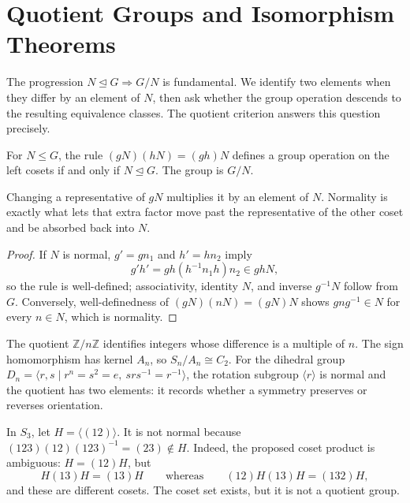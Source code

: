 \section{Quotient Groups and Isomorphism Theorems}

The progression \(N\trianglelefteq G\Rightarrow G/N\) is fundamental.  We
identify two elements when they differ by an element of \(N\), then ask whether
the group operation descends to the resulting equivalence classes.  The
quotient criterion answers this question precisely.

\begin{theorem}
For \(N\leq G\), the rule \((gN)(hN)=(gh)N\) defines a group operation on
the left cosets if and only if \(N\trianglelefteq G\).  The group is \(G/N\).
\end{theorem}
\begin{proofidea}
Changing a representative of \(gN\) multiplies it by an element of \(N\).
Normality is exactly what lets that extra factor move past the representative
of the other coset and be absorbed back into \(N\).
\end{proofidea}
\begin{proof}
If \(N\) is normal, \(g'=gn_1\) and \(h'=hn_2\) imply
\[
g'h'=gh(h^{-1}n_1h)n_2\in ghN,
\]
so the rule is well-defined; associativity, identity \(N\), and inverse
\(g^{-1}N\) follow from \(G\).  Conversely, well-definedness of
\((gN)(nN)=(gN)N\) shows \(gng^{-1}\in N\) for every \(n\in N\), which is
normality.
\end{proof}

\begin{example}
The quotient \(\mathbb Z/n\mathbb Z\) identifies integers whose difference is
a multiple of \(n\).  The sign homomorphism has kernel \(A_n\), so
\(S_n/A_n\cong C_2\).  For the dihedral group
\(D_n=\langle r,s\mid r^n=s^2=e,\ srs^{-1}=r^{-1}\rangle\), the rotation
subgroup \(\langle r\rangle\) is normal and the quotient has two elements:
it records whether a symmetry preserves or reverses orientation.
\end{example}

\begin{example}
In \(S_3\), let \(H=\langle(12)\rangle\).  It is not normal because
\((123)(12)(123)^{-1}=(23)\notin H\).  Indeed, the proposed coset product is
ambiguous: \(H=(12)H\), but
\[
H(13)H=(13)H\qquad\text{whereas}\qquad(12)H(13)H=(132)H,
\]
and these are different cosets.  The coset set exists, but it is not a
quotient group.
\end{example}

